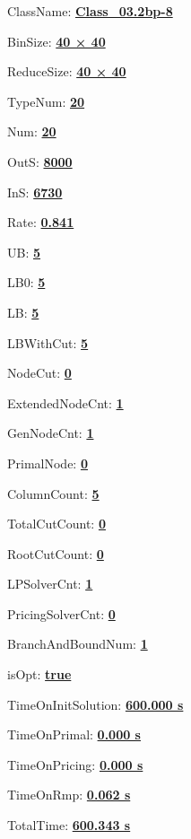 \documentclass[11pt]{article}
\begin{document}
\pagestyle{empty}


ClassName: \underline{\textbf{Class_03.2bp-8}}
\par
BinSize: \underline{\textbf{40 × 40}}
\par
ReduceSize: \underline{\textbf{40 × 40}}
\par
TypeNum: \underline{\textbf{20}}
\par
Num: \underline{\textbf{20}}
\par
OutS: \underline{\textbf{8000}}
\par
InS: \underline{\textbf{6730}}
\par
Rate: \underline{\textbf{0.841}}
\par
UB: \underline{\textbf{5}}
\par
LB0: \underline{\textbf{5}}
\par
LB: \underline{\textbf{5}}
\par
LBWithCut: \underline{\textbf{5}}
\par
NodeCut: \underline{\textbf{0}}
\par
ExtendedNodeCnt: \underline{\textbf{1}}
\par
GenNodeCnt: \underline{\textbf{1}}
\par
PrimalNode: \underline{\textbf{0}}
\par
ColumnCount: \underline{\textbf{5}}
\par
TotalCutCount: \underline{\textbf{0}}
\par
RootCutCount: \underline{\textbf{0}}
\par
LPSolverCnt: \underline{\textbf{1}}
\par
PricingSolverCnt: \underline{\textbf{0}}
\par
BranchAndBoundNum: \underline{\textbf{1}}
\par
isOpt: \underline{\textbf{true}}
\par
TimeOnInitSolution: \underline{\textbf{600.000 s}}
\par
TimeOnPrimal: \underline{\textbf{0.000 s}}
\par
TimeOnPricing: \underline{\textbf{0.000 s}}
\par
TimeOnRmp: \underline{\textbf{0.062 s}}
\par
TotalTime: \underline{\textbf{600.343 s}}
\par
\newpage


\end{document}
